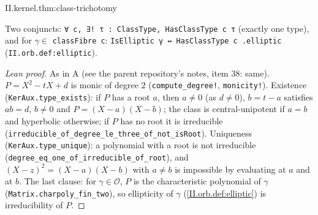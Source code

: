 \begin{theorem}[trichotomy]
\end{theorem}
\begin{tfformal}{II.kernel.thm:class-trichotomy}
\begin{tffidelity}
Two conjuncts: \texttt{∀ c, ∃! τ : ClassType, HasClassType c τ} (exactly one type), and for $\gamma\in$ \texttt{classFibre c}: \texttt{IsElliptic γ ↔ HasClassType c .elliptic} (\texttt{II.orb.def:elliptic}).
\end{tffidelity}
\end{tfformal}
\begin{proof}[Lean proof]
As in A (see the parent repository's notes, item 38: same). $P=X^2-tX+d$ is monic of degree $2$ (\texttt{compute\_degree!}, \texttt{monicity!}). Existence (\texttt{KerAux.type\_exists}): if $P$ has a root $a$, then $a\ne0$ (as $d\ne0$), $b=t-a$ satisfies $ab=d$, $b\ne0$ and $P=(X-a)(X-b)$; the class is central-unipotent if $a=b$ and hyperbolic otherwise; if $P$ has no root it is irreducible (\texttt{irreducible\_of\_degree\_le\_three\_of\_not\_isRoot}). Uniqueness (\texttt{KerAux.type\_unique}): a polynomial with a root is not irreducible (\texttt{degree\_eq\_one\_of\_irreducible\_of\_root}), and $(X-z)^2=(X-a)(X-b)$ with $a\ne b$ is impossible by evaluating at $a$ and at $b$. The last clause: for $\gamma\in\mathcal O$, $P$ is the characteristic polynomial of $\gamma$ (\texttt{Matrix.charpoly\_fin\_two}), so ellipticity of $\gamma$ (\cref{II.orb.def:elliptic}) is irreducibility of $P$.
\end{proof}

